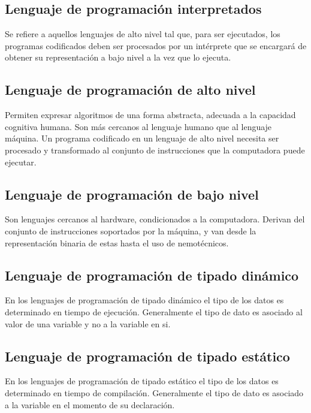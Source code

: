 \subsection{Lenguaje de programación interpretados}
Se refiere a aquellos lenguajes de alto nivel tal que, para ser ejecutados, los programas codificados deben ser procesados por un intérprete que 
se encargará de obtener su representación a bajo nivel a la vez que lo ejecuta.\\

\subsection{Lenguaje de programación de alto nivel}
Permiten expresar algoritmos de una forma abstracta, adecuada a la capacidad cognitiva humana. Son más cercanos
al lenguaje humano que al lenguaje máquina. Un programa codificado en un lenguaje de alto nivel necesita ser procesado 
y transformado al conjunto de instrucciones que la computadora puede ejecutar. \\

\subsection{Lenguaje de programación de bajo nivel}
Son lenguajes cercanos al hardware, condicionados a la computadora. Derivan del conjunto de instrucciones 
soportados por la máquina, y van desde la representación binaria de estas hasta el uso de nemotécnicos.\\

\subsection{Lenguaje de programación de tipado dinámico}
En los lenguajes de programación de tipado dinámico el tipo de los datos es determinado en tiempo de ejecución. Generalmente el tipo de dato es asociado 
al valor de una variable y no a la variable en si. 
 
\subsection{Lenguaje de programación de tipado estático}
En los lenguajes de programación de tipado estático el tipo de los datos es determinado en tiempo de compilación. Generalmente el tipo de dato es asociado 
a la variable en el momento de su declaración.  \\

